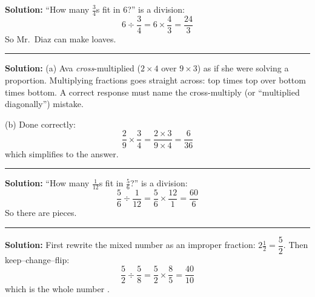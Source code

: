 \documentclass[12pt]{article}
\begin{document}

\textbf{Solution:} ``How many $\tfrac{3}{4}$s fit in $6$?'' is a division:
\[ 6 \div \frac{3}{4} = 6 \times \frac{4}{3} = \frac{24}{3} \]
So Mr.\ Diaz can make  loaves.

\vspace{0.2cm}\noindent\rule{\linewidth}{0.2pt}\vspace{0.1cm}


\textbf{Solution:}
(a) Ava \emph{cross}-multiplied ($2 \times 4$ over $9 \times 3$) as if she were
solving a proportion. Multiplying fractions goes straight across: top times
top over bottom times bottom. A correct response must name the cross-multiply
(or ``multiplied diagonally'') mistake.

(b) Done correctly:
\[ \frac{2}{9} \times \frac{3}{4} = \frac{2 \times 3}{9 \times 4}
   = \frac{6}{36} \]
which simplifies to the answer. 

\vspace{0.2cm}\noindent\rule{\linewidth}{0.2pt}\vspace{0.1cm}


\textbf{Solution:} ``How many $\tfrac{1}{12}$s fit in $\tfrac{5}{6}$?'' is a
division:
\[ \frac{5}{6} \div \frac{1}{12} = \frac{5}{6} \times \frac{12}{1}
   = \frac{60}{6} \]
So there are  pieces.

\vspace{0.2cm}\noindent\rule{\linewidth}{0.2pt}\vspace{0.1cm}


\textbf{Solution:} First rewrite the mixed number as an improper fraction:
$2\tfrac{1}{2} = \dfrac{5}{2}$. Then keep--change--flip:
\[ \frac{5}{2} \div \frac{5}{8} = \frac{5}{2} \times \frac{8}{5}
   = \frac{40}{10} \]
which is the whole number .
\end{document}
